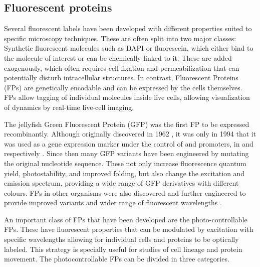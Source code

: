   \subsection{Fluorescent proteins}
    Several fluorescent labels have been developed with different
    properties suited to specific microscopy techniques.
    These are often split into two major classes:
    Synthetic fluorescent
    molecules such as DAPI or fluorescein, which either bind to the molecule of
    interest or can be chemically linked to it.
    These are added exogenously, which often requires cell
    fixation and permeabilization that can potentially
    disturb intracellular structures.
    In contrast, Fluorescent Proteins (FPs)
    are genetically encodable and can be expressed by the cells themselves.
    FPs allow tagging of individual molecules inside live cells, allowing
    visualization of dynamics by real-time live-cell imaging.

    The  jellyfish
    Green Fluorescent Protein (GFP) was
    the first FP to be expressed recombinantly.
    Although originally discovered in 1962 \citep{shimomura1962-gfp-discovery},
    it was only in 1994 that it was used as a gene expression
    marker under the control of  and
     promoters, in  and 
    respectively \citep{gfp-first-expression-marker}.
    Since then many GFP variants have been engineered by mutating the
    original nucleotide sequence.  These not only increase fluorescence
    quantum yield, photostability, and improved folding, but also change
    the excitation and emission spectrum, providing a wide range of GFP
    derivatives with different colours.  FPs in other organisms were also
    discovered and further engineered to provide improved
    variants and wider range of fluorescent wavelengths
    \citep{FP-color-palette}.

    An important class of FPs that have been developed are the
    photo-controllable FPs.
    These have
    fluorescent properties that can be modulated by excitation with specific
    wavelengths allowing for individual cells and proteins to be optically
    labeled.  This strategy is specially useful for studies of cell
    lineage and protein movement.
    The photocontrollable FPs can be divided in three categories.



